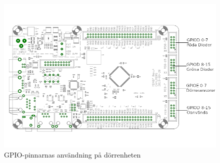 \begin{figure}[h]
    \centering
    \includegraphics[scale=0.55]{dokumentation/projektrapport/IMAGES/doorgpio.png}
    \caption{GPIO-pinnarnas användning på dörrenheten\cite{md407}}
    \label{fig:doorgpio}
\end{figure}
